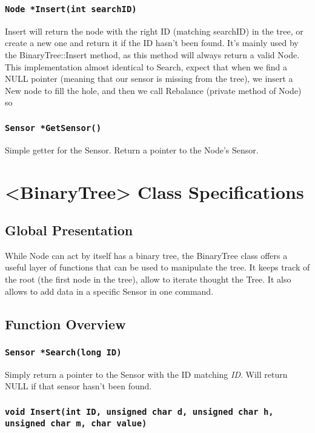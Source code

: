 \documentclass[10pt]{article}
\begin{document}
\subsubsection*{\tt Node *Insert(int searchID)}
Insert will return the node with the right ID (matching searchID) in the tree, or create a new one and return it if the ID hasn't been found. It's mainly used by the BinaryTree::Insert method, as this method will always return a valid Node.
This implementation almost identical to Search, expect that when we find a NULL pointer (meaning that our sensor is missing from the tree), we insert a New node to fill the hole, and then we call Rebalance (private method of Node) so

\subsubsection*{\tt Sensor *GetSensor()}
Simple getter for the Sensor. Return a pointer to the Node's Sensor.

\section{<BinaryTree> Class Specifications}
\subsection{Global Presentation}
While Node can act by itself has a binary tree, the BinaryTree class offers a useful layer of functions that can be used to manipulate the tree. It keeps track of the root (the first node in the tree), allow to iterate thought the Tree. It also allows to add data in a specific Sensor in one command.

\subsection{Function Overview}
\subsubsection*{\tt Sensor *Search(long ID)}
Simply return a pointer to the Sensor with the ID matching \emph{ID}. Will return NULL if that sensor hasn't been found.

\subsubsection*{\tt void Insert(int ID, 
				unsigned char d,
				unsigned char h,
				unsigned char m,
				char value)}
\end{document}
